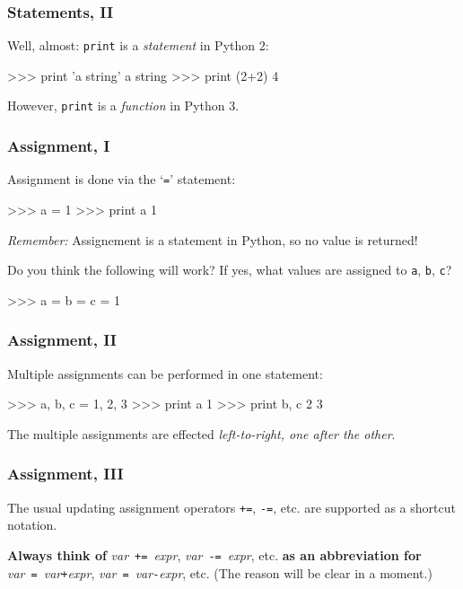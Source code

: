 \documentclass[english,serif,mathserif,xcolor=pdftex,dvipsnames,table]{beamer}
\begin{document}
\begin{frame}[fragile]
  \frametitle{Statements, II}
  Well, almost: \texttt{print} is a \emph{statement} in Python 2:
\begin{semiverbatim}
>>> print 'a string'
a string
>>> print (2+2)
4
\end{semiverbatim}
  However, \texttt{print} is a \emph{function} in Python 3.

\end{frame}


\begin{frame}[fragile]
  \frametitle{Assignment, I}
  Assignment is done via the `\texttt{=}' statement:
\begin{semiverbatim}
>>> a = 1
>>> print a
1
\end{semiverbatim}
  \emph{Remember:} Assignement is a statement in Python, so no value is
  returned!

  \+
  \begin{question}
    Do you think the following will work?  If yes, what values are
    assigned to \texttt{a}, \texttt{b}, \texttt{c}?
    \begin{semiverbatim}
      >>> a = b = c = 1
    \end{semiverbatim}
  \end{question}
\end{frame}


\begin{frame}[fragile]
  \frametitle{Assignment, II}
  Multiple assignments can be performed in one statement:
\begin{semiverbatim}
>>> a, b, c = 1, 2, 3
>>> print a
1
>>> print b, c
2 3
\end{semiverbatim}

  The multiple assignments are effected \emph{left-to-right, one after
  the other}.
\end{frame}


\begin{frame}
  \frametitle{Assignment, III}
  The usual updating assignment operators \texttt{+=},
  \texttt{-=}, etc. are supported as a shortcut notation.

  \+ 
  \textbf{Always think of} 
  \emph{var}~\texttt{+=}~\emph{expr}, \emph{var}~\texttt{-=}~\emph{expr}, etc.
  \textbf{as an abbreviation for}
  \emph{var}~\texttt{=}~\emph{var}\texttt{+}\emph{expr},
  \emph{var}~\texttt{=}~\emph{var}\texttt{-}\emph{expr},
  etc.
  (The reason will be clear in a moment.)
\end{frame}
\end{document}

